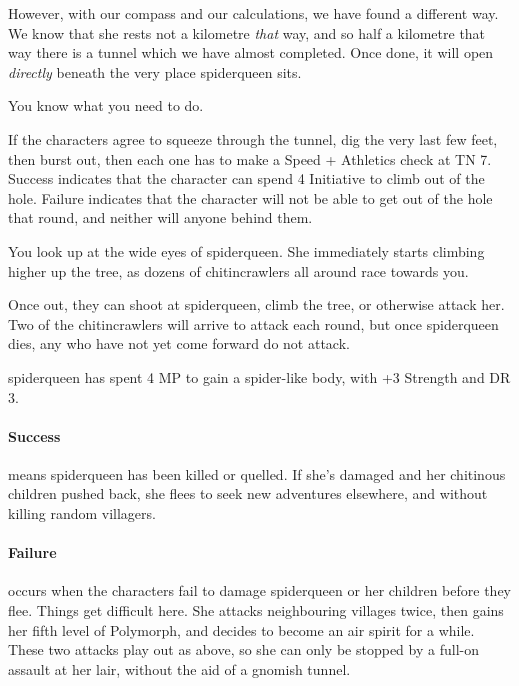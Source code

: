 \begin{multicols}{2}
\begin{speechtext}
  However, with our compass and our calculations, we have found a different way.
  We know that she rests not a kilometre \emph{that} way, and so half a kilometre that way there is a tunnel which we have almost completed.
  Once done, it will open \emph{directly} beneath the very place \gls{spiderqueen} sits.

  You know what you need to do.

\end{speechtext}

If the characters agree to squeeze through the tunnel, dig the very last few feet, then burst out, then each one has to make a Speed + Athletics check at TN 7.
Success indicates that the character can spend 4 Initiative to climb out of the hole.
Failure indicates that the character will not be able to get out of the hole that round, and neither will anyone behind them.

\begin{boxtext}

  You look up at the wide eyes of \gls{spiderqueen}.
  She immediately starts climbing higher up the tree, as dozens of chitincrawlers all around race towards you.

\end{boxtext}

Once out, they can shoot at \gls{spiderqueen}, climb the tree, or otherwise attack her.
Two of the chitincrawlers will arrive to attack each round, but once \gls{spiderqueen} dies, any who have not yet come forward do not attack.

\keras



\spiderqueen

\Gls{spiderqueen} has spent 4 MP to gain a spider-like body, with +3 Strength and DR 3.


\paragraph{Success} means \gls{spiderqueen} has been killed or quelled.
If she's damaged and her chitinous children pushed back, she flees to seek new adventures elsewhere, and without killing random villagers.

\paragraph{Failure} occurs when the characters fail to damage \gls{spiderqueen} or her children before they flee.
Things get difficult here.
She attacks neighbouring villages twice, then gains her fifth level of Polymorph, and decides to become an air spirit for a while.
These two attacks play out as above, so she can only be stopped by a full-on assault at her lair, without the aid of a gnomish tunnel.


\end{multicols}
